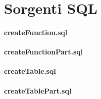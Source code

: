 \chapter{Sorgenti SQL}
%
%
%
%
%
%
%
%
\subsubsection{createFunction.sql}

\subsubsection{createFunctionPart.sql}
\subsubsection{createTable.sql}
\subsubsection{createTablePart.sql}
